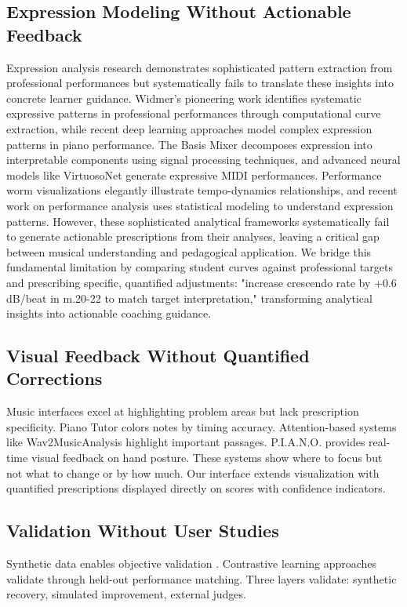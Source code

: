 \documentclass[sigconf,review,anonymous]{acmart}
\begin{document}
\subsection{Expression Modeling Without Actionable Feedback}
Expression analysis research demonstrates sophisticated pattern extraction from professional performances but systematically fails to translate these insights into concrete learner guidance.
Widmer's pioneering work \cite{widmer2003} identifies systematic expressive patterns in professional performances through computational curve extraction, while recent deep learning approaches \cite{jeong2019} model complex expression patterns in piano performance.
The Basis Mixer \cite{giraldo2019} decomposes expression into interpretable components using signal processing techniques, and advanced neural models like VirtuosoNet \cite{jeong2019} generate expressive MIDI performances.
Performance worm visualizations \cite{goebl2008} elegantly illustrate tempo-dynamics relationships, and recent work on performance analysis \cite{cancino2018} uses statistical modeling to understand expression patterns.
However, these sophisticated analytical frameworks systematically fail to generate actionable prescriptions from their analyses, leaving a critical gap between musical understanding and pedagogical application.
We bridge this fundamental limitation by comparing student curves against professional targets and prescribing specific, quantified adjustments: "increase crescendo rate by +0.6 dB/beat in m.20-22 to match target interpretation," transforming analytical insights into actionable coaching guidance.

\subsection{Visual Feedback Without Quantified Corrections}
Music interfaces excel at highlighting problem areas but lack prescription specificity.
Piano Tutor \cite{dannenberg2013} colors notes by timing accuracy.
Attention-based systems like Wav2MusicAnalysis \cite{kawamura2021uist} highlight important passages.
P.I.A.N.O. \cite{oshima2021} provides real-time visual feedback on hand posture.
These systems show where to focus but not what to change or by how much.
Our interface extends visualization with quantified prescriptions displayed directly on scores with confidence indicators.

\subsection{Validation Without User Studies}
Synthetic data enables objective validation \cite{giraldo2019}.
Contrastive learning approaches validate through held-out performance matching.
Three layers validate: synthetic recovery, simulated improvement, external judges.
\end{document}

